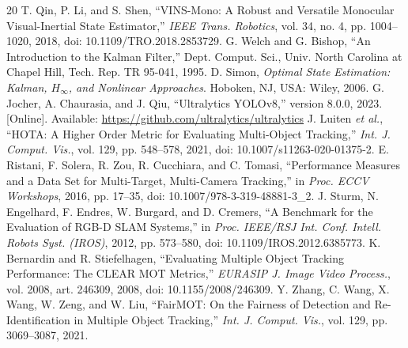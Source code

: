 \documentclass[conference]{IEEEtran}
\begin{document}
\begin{thebibliography}{20}
 T. Qin, P. Li, and S. Shen, ``VINS-Mono: A Robust and Versatile Monocular Visual-Inertial State Estimator,'' \textit{IEEE Trans. Robotics}, vol. 34, no. 4, pp. 1004--1020, 2018, doi: 10.1109/TRO.2018.2853729.
 G. Welch and G. Bishop, ``An Introduction to the Kalman Filter,'' Dept. Comput. Sci., Univ. North Carolina at Chapel Hill, Tech. Rep. TR 95-041, 1995.
 D. Simon, \textit{Optimal State Estimation: Kalman, $H_\infty$, and Nonlinear Approaches}. Hoboken, NJ, USA: Wiley, 2006.
 G. Jocher, A. Chaurasia, and J. Qiu, ``Ultralytics YOLOv8,'' version 8.0.0, 2023. [Online]. Available: \url{https://github.com/ultralytics/ultralytics}
 J. Luiten \textit{et al.}, ``HOTA: A Higher Order Metric for Evaluating Multi-Object Tracking,'' \textit{Int. J. Comput. Vis.}, vol. 129, pp. 548--578, 2021, doi: 10.1007/s11263-020-01375-2.
 E. Ristani, F. Solera, R. Zou, R. Cucchiara, and C. Tomasi, ``Performance Measures and a Data Set for Multi-Target, Multi-Camera Tracking,'' in \textit{Proc. ECCV Workshops}, 2016, pp. 17--35, doi: 10.1007/978-3-319-48881-3\_2.
 J. Sturm, N. Engelhard, F. Endres, W. Burgard, and D. Cremers, ``A Benchmark for the Evaluation of RGB-D SLAM Systems,'' in \textit{Proc. IEEE/RSJ Int. Conf. Intell. Robots Syst. (IROS)}, 2012, pp. 573--580, doi: 10.1109/IROS.2012.6385773.
 K. Bernardin and R. Stiefelhagen, ``Evaluating Multiple Object Tracking Performance: The CLEAR MOT Metrics,'' \textit{EURASIP J. Image Video Process.}, vol. 2008, art. 246309, 2008, doi: 10.1155/2008/246309.
 Y. Zhang, C. Wang, X. Wang, W. Zeng, and W. Liu, ``FairMOT: On the Fairness of Detection and Re-Identification in Multiple Object Tracking,'' \textit{Int. J. Comput. Vis.}, vol. 129, pp. 3069--3087, 2021.
\end{thebibliography}
\end{document}
